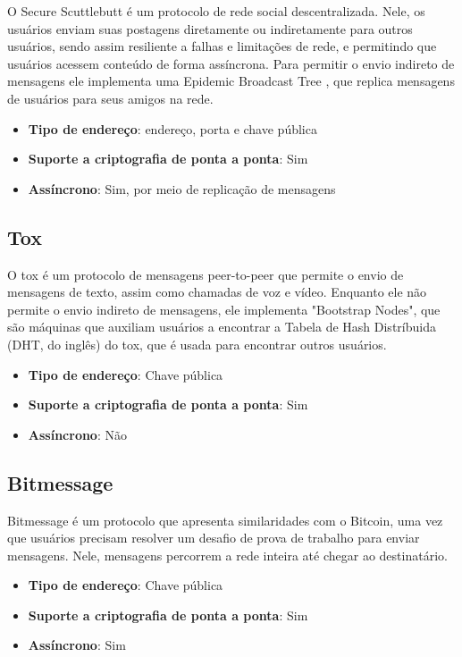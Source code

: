 O Secure Scuttlebutt é um protocolo de rede social descentralizada. Nele, os usuários enviam suas postagens diretamente ou indiretamente para outros usuários, sendo assim resiliente a falhas e limitações de rede, e permitindo que usuários acessem conteúdo de forma assíncrona. Para permitir o envio indireto de mensagens ele implementa uma Epidemic Broadcast Tree \cite{ebtpaper}, que replica mensagens de usuários para seus amigos na rede. \cite{scuttlebutt}
\cite{scuttlebutt}

\begin{itemize}
  \item \textbf{Tipo de endereço}: endereço, porta e chave pública
  \item \textbf{Suporte a criptografia de ponta a ponta}: Sim
  \item \textbf{Assíncrono}: Sim, por meio de replicação de mensagens
\end{itemize}

\subsection{Tox}

O tox é um protocolo de mensagens peer-to-peer que permite o envio de mensagens de texto, assim como chamadas de voz e vídeo. Enquanto ele não permite o envio indireto de mensagens, ele implementa "Bootstrap Nodes", que são máquinas que auxiliam usuários a encontrar a Tabela de Hash Distríbuida (DHT, do inglês) do tox, que é usada para encontrar outros usuários. \cite{toxcore}

\begin{itemize}
  \item \textbf{Tipo de endereço}: Chave pública
  \item \textbf{Suporte a criptografia de ponta a ponta}: Sim
  \item \textbf{Assíncrono}: Não
\end{itemize}

\subsection{Bitmessage}

Bitmessage é um protocolo que apresenta similaridades com o Bitcoin, uma vez que usuários precisam resolver um desafio de prova de trabalho para enviar mensagens. Nele, mensagens percorrem a rede inteira até chegar ao destinatário. \cite{bitmessage}

\begin{itemize}
  \item \textbf{Tipo de endereço}: Chave pública
  \item \textbf{Suporte a criptografia de ponta a ponta}: Sim
  \item \textbf{Assíncrono}: Sim
\end{itemize}

